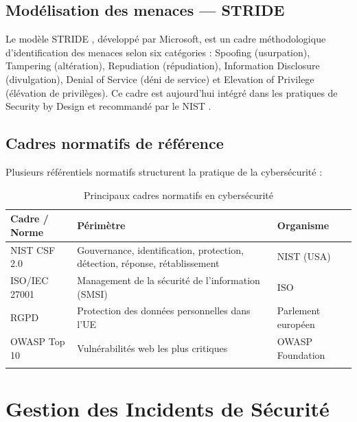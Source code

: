 \subsection{Modélisation des menaces — STRIDE}
Le modèle STRIDE \cite{stride}, développé par Microsoft, est un cadre méthodologique d'identification des menaces selon six catégories : Spoofing (usurpation), Tampering (altération), Repudiation (répudiation), Information Disclosure (divulgation), Denial of Service (déni de service) et Elevation of Privilege (élévation de privilèges). Ce cadre est aujourd'hui intégré dans les pratiques de Security by Design et recommandé par le NIST \cite{nist}.

\subsection{Cadres normatifs de référence}
Plusieurs référentiels normatifs structurent la pratique de la cybersécurité :

\begin{longtable}{|m{4cm}|m{6cm}|m{3cm}|}
\hline
\textbf{Cadre / Norme} & \textbf{Périmètre} & \textbf{Organisme} \\
\hline
\endhead
\endfoot
\endlastfoot
\hline
NIST CSF 2.0 \cite{nist} & Gouvernance, identification, protection, détection, réponse, rétablissement & NIST (USA) \\
\hline
ISO/IEC 27001 & Management de la sécurité de l'information (SMSI) & ISO \\
\hline
RGPD \cite{rgpd} & Protection des données personnelles dans l'UE & Parlement européen \\
\hline
OWASP Top 10 & Vulnérabilités web les plus critiques & OWASP Foundation \\
\hline
\captionsetup{justification=centering,margin=2cm}
\caption{Principaux cadres normatifs en cybersécurité}
\label{tab:cadres}
\end{longtable}

\section{Gestion des Incidents de Sécurité}

